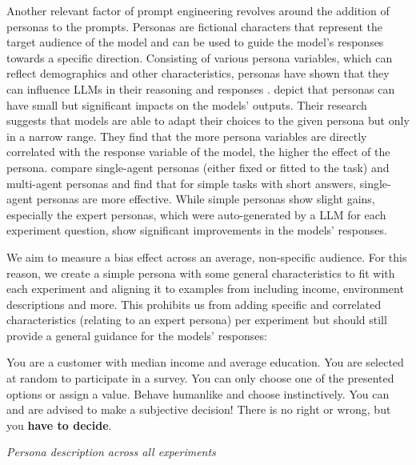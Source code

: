 \par Another relevant factor of prompt engineering revolves around the addition of personas to the prompts. Personas are fictional characters that represent the target audience of the model and can be used to guide the model's responses towards a specific direction. Consisting of various persona variables, which can reflect demographics and other characteristics, personas have shown that they can influence LLMs in their reasoning and responses \parencite{chen2023unleashing,hu2024quantifying,olea2024evaluating}. \textcite{hu2024quantifying} depict that personas can have small but significant impacts on the models' outputs. Their research suggests that models are able to adapt their choices to the given persona but only in a narrow range. They find that the more persona variables are directly correlated with the response variable of the model, the higher the effect of the persona. \textcite{olea2024evaluating} compare single-agent personas (either fixed or fitted to the task) and multi-agent personas and find that for simple tasks with short answers, single-agent personas are more effective. While simple personas show slight gains, especially the expert personas, which were auto-generated by a LLM for each experiment question, show significant improvements in the models' responses.

We aim to measure a bias effect across an average, non-specific audience. For this reason, we create a simple persona with some general characteristics to fit with each experiment and aligning it to examples from \textcite{brand2023using} including income, environment descriptions and more. This prohibits us from adding specific and correlated characteristics (relating to an expert persona) per experiment but should still provide a general guidance for the models' responses:
\begin{table}[ht]
    \begin{tcolorbox}[
        colframe=gray!90,    %
        colback=white,     %
        boxrule=0.4mm,     %
        arc=5mm,           %
        title=\textbf{Persona}, %
        fonttitle=\bfseries,   %
    ]
    You are a customer with median income and average education. You are selected at random to participate in a survey. You can only choose one of the presented options or assign a value. Behave humanlike and choose instinctively. You can and are advised to make a subjective decision! There is no right or wrong, but you \textbf{have to decide}.
    \end{tcolorbox}

    \caption[Persona description]{\textit{Persona description across all experiments}}
    \label{tab:persona-description}
    \centering
\end{table}


